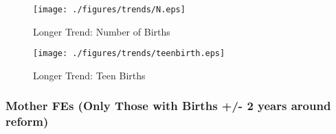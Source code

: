 \documentclass[10pt,letterpaper,subeqn]{beamer}
\begin{document}
\begin{frame}
\begin{figure}[htpb!]
  \begin{center}
  \centering
  \caption{Longer Trend: Number of Births}
  \texttt{[image: ./figures/trends/N.eps]}
\end{center}
\end{figure}
\footnotesize{\hyperlink{Trends}{}}
\end{frame}

\begin{frame}
\begin{figure}[htpb!]
  \begin{center}
  \centering
  \caption{Longer Trend: Teen Births}
  \texttt{[image: ./figures/trends/teenbirth.eps]}
\end{center}
\end{figure}
\footnotesize{\hyperlink{Trends}{}}
\end{frame}

\begin{frame}[label=FE2]
\frametitle{Mother FEs (Only Those with Births +/- 2 years around reform)}

\footnotesize{\hyperlink{Summary}{}}
\end{frame}


\begin{frame}[label=lowEd]
  
\footnotesize{\hyperlink{Summary}{}}
\end{frame}

\begin{frame}[label=highEd]
  
\footnotesize{\hyperlink{Summary}{}}
\end{frame}
\end{document}
